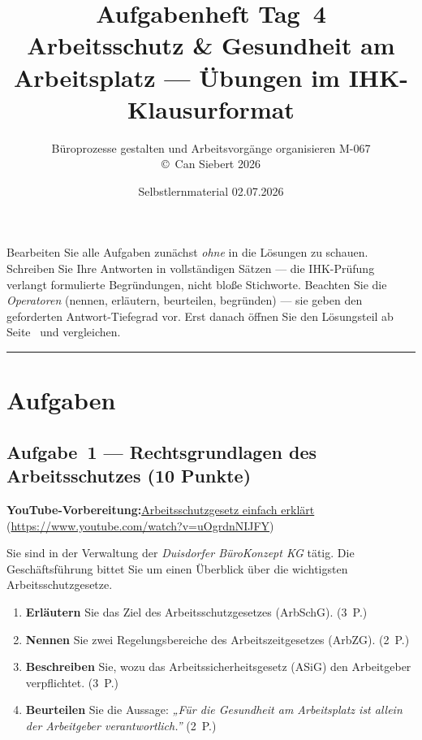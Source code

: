 \documentclass[11pt, a4paper]{article}
\title{\vspace*{-1.5cm}\Huge\bfseries\color{bfwPrimaryDark}Aufgabenheft Tag~4\\[0.4em]
  \large\color{bfwInkSoft}\textnormal{Arbeitsschutz \& Gesundheit am Arbeitsplatz --- Übungen im IHK-Klausurformat}}
\author{\textsf{Büroprozesse gestalten und Arbeitsvorgänge organisieren \textperiodcentered{} M-067}\\
\textsf{\small\copyright\ Can Siebert\,\textperiodcentered\,2026}}
\date{Selbstlernmaterial \textperiodcentered{} 02.07.2026}
\begin{document}
\maketitle
\thispagestyle{empty}

\begin{merksatz}[title={\bfseries So nutzen Sie dieses Aufgabenheft}]
Bearbeiten Sie alle Aufgaben zunächst \emph{ohne} in die Lösungen zu schauen. Schreiben
Sie Ihre Antworten in vollständigen Sätzen --- die IHK-Prüfung verlangt formulierte
Begründungen, nicht bloße Stichworte. Beachten Sie die \emph{Operatoren} (nennen,
erläutern, beurteilen, begründen) --- sie geben den geforderten Antwort-Tiefegrad vor.
Erst danach öffnen Sie den Lösungsteil ab Seite~\pageref{loesungen} und vergleichen.
\end{merksatz}

\tableofcontents
\vspace{1em}
\hrule

\section{Aufgaben}

\subsection*{Aufgabe~1 --- Rechtsgrundlagen des Arbeitsschutzes (10 Punkte)}

\noindent\textbf{\color{bfwAccent}YouTube-Vorbereitung:}\enspace \href{https://www.youtube.com/watch?v=uOgrdnNIJFY}{Arbeitsschutzgesetz einfach erklärt} (\url{https://www.youtube.com/watch?v=uOgrdnNIJFY})

\medskip
Sie sind in der Verwaltung der \emph{Duisdorfer BüroKonzept KG} tätig. Die Geschäftsführung
bittet Sie um einen Überblick über die wichtigsten Arbeitsschutzgesetze.

\begin{enumerate}[label=(\alph*)]
  \item \textbf{Erläutern} Sie das Ziel des Arbeitsschutzgesetzes (ArbSchG). \hfill (3~P.)
  \item \textbf{Nennen} Sie zwei Regelungsbereiche des Arbeitszeitgesetzes (ArbZG). \hfill (2~P.)
  \item \textbf{Beschreiben} Sie, wozu das Arbeitssicherheitsgesetz (ASiG) den Arbeitgeber verpflichtet. \hfill (3~P.)
  \item \textbf{Beurteilen} Sie die Aussage: \emph{„Für die Gesundheit am Arbeitsplatz ist allein der Arbeitgeber verantwortlich.”} \hfill (2~P.)
\end{enumerate}
\end{document}

